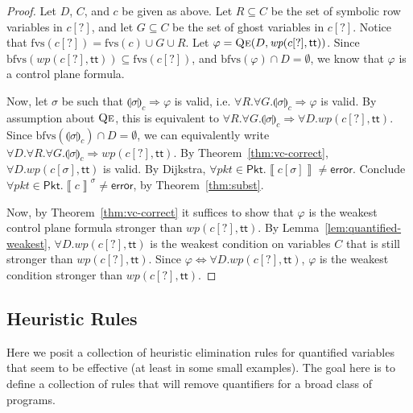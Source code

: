 \documentclass{article}
\newcommand{\pkt}{\mathit{pkt}}
\newcommand{\error}{\mathsf{error}}
\newcommand{\denote}[1]{\left\llbracket#1\right\rrbracket}
\newcommand{\TRUE}{\mathsf{tt}}
\newcommand{\Pkt}{\mathsf{Pkt}}
\newcommand{\WP}{\textit{wp}}
\newcommand{\state}[1]{\llparenthesis#1\rrparenthesis}
\newcommand{\instr}{[?]}
\newcommand{\qe}{\textsc{Qe}}
\newcommand{\fvs}{\textrm{fvs}}
\newcommand{\bfvs}{\textrm{bfvs}}
\theoremstyle{plain}
\theoremstyle{definition}
\theoremstyle{remark}
\begin{document}
\begin{proof}
  Let $D$, $C$, and $c$ be given as above. Let $R \subseteq C$ be the set of
  symbolic row variables in $c\instr$, and let $G \subseteq C$ be the set of
  ghost variables in $c\instr$. Notice that $\fvs(c\instr) = \fvs(c) \cup G \cup
  R$. Let $\varphi = \qe(D,\WP(c\instr, \TRUE))$. Since
  $\bfvs(\WP(c\instr,\TRUE)) \subseteq \fvs(c\instr)$, and $\bfvs(\varphi) \cap
  D = \emptyset$, we know that $\varphi$ is a control plane formula.

  Now, let $\sigma$ be such that $\state\sigma_c \Rightarrow \varphi$ is valid,
  i.e. $\forall R. \forall G. \state\sigma_c \Rightarrow \varphi$ is valid. By
  assumption about $\qe$, this is equivalent to $\forall R.\forall G.
  \state\sigma_c \Rightarrow \forall D. \WP(c\instr, \TRUE)$. Since
  $\bfvs(\state\sigma_c) \cap D = \emptyset$, we can equivalently write $\forall
  D. \forall R. \forall G. \state\sigma_c \Rightarrow \WP(c\instr,\TRUE)$. By
  Theorem~\ref{thm:vc-correct}, $\forall D. \WP(c[\sigma],\TRUE)$ is valid. By Dijkstra,
  $\forall \pkt \in \Pkt. \denote{c[\sigma]} \neq \error$. Conclude $\forall
  \pkt \in \Pkt. \denote{c}^\sigma \neq \error$, by Theorem~\ref{thm:subst}.

  Now, by Theorem~\ref{thm:vc-correct} it suffices to show that $\varphi$ is the
  weakest control plane formula stronger than $\WP(c[?], \TRUE)$. By
  Lemma~\ref{lem:quantified-weakest}, $\forall D. \WP(c\instr, \TRUE)$ is the
  weakest condition on variables $C$ that is still stronger than
  $\WP(c\instr,\TRUE)$. Since $\varphi \Leftrightarrow \forall D. \WP(c\instr,
  \TRUE)$, $\varphi$ is the weakest condition stronger than $\WP(c\instr,\TRUE)$.

\end{proof}

\subsection{Heuristic Rules}

Here we posit a collection of heuristic elimination rules for quantified
variables that seem to be effective (at least in some small examples). The goal
here is to define a collection of rules that will remove quantifiers for a broad
class of programs.
\end{document}
